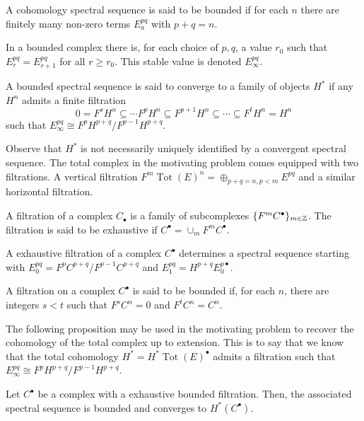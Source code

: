 \begin{definition}
  A cohomology spectral sequence is said to be bounded if for each $n$ there are finitely many non-zero terms $E^{pq}_a$ with $p+q = n$.
\end{definition}
In a bounded complex there is, for each choice of $p,q$, a value $r_0$ such that $E_{r}^{pq}= E_{r+1}^{pq}$ for all $r \geq r_0$. This stable value is denoted $E^{pq}_\infty$.
\begin{definition}
  A bounded spectral sequence is said to converge to a family of objects $H^*$ if any $H^n$ admits a finite filtration
  $$0 = F^s H^n \subseteq \cdots F^p H^n \subseteq F^{p+1}H^n \subseteq \cdots \subseteq F^t H^n = H^n $$
  such that $E^{pq}_\infty \cong F^p H^{p+q} / F^{p-1} H^{p+q}$.
\end{definition}
Observe that $H^*$ is not necessarily uniquely identified by a convergent spectral sequence.
The total complex in the motivating problem comes equipped with two filtrations.
A vertical filtration $F^{m} \operatorname{Tot}(E)^n = \oplus_{p+q = n, p <m} E^{pq}$ and a similar horizontal filtration.
\begin{definition}
  A filtration of a complex $C_\bullet$ is a family of subcomplexes $\{F^m C^\bullet\}_{m\in \mathbb{Z}}$.
  The filtration is said to be exhaustive if $C^\bullet = \cup_m F^mC^\bullet$.
\end{definition}
\begin{proposition}{\cite[Chapter 5]{weibel1995introduction}}
 A exhaustive filtration of a complex $C^\bullet$ determines a spectral sequence starting with $E^{pq}_0 = F^p C^{p+q}/F^{p-1}C^{p+q}$ and $E^{pq}_1= H^{p+q} E^{p\bullet}_0$.
\end{proposition}
\begin{definition}
  A filtration on a complex $C^\bullet$ is said to be bounded
 if, for each $n$, there are integers $s<t$ such that $F^s C^n = 0$ and $F^t C^n = C^n$.
\end{definition}
The following proposition may be used in the motivating problem to recover the cohomology of the total complex up to extension.
This is to say that we know that the total cohomology $H^* = H^* \operatorname{Tot}(E)^\bullet$ admits a filtration such that $E^{pq}_\infty \cong F^p H^{p+q}/ F^{p-1} H^{p+q}$.
 \begin{proposition}{\cite[Chapter 5]{weibel1995introduction}}\label{prop: FiltrationSpectral}
   Let $C^\bullet$ be a complex with a exhaustive bounded filtration.
   Then, the associated spectral sequence is bounded and converges to $H^*(C^\bullet)$.
 \end{proposition}
